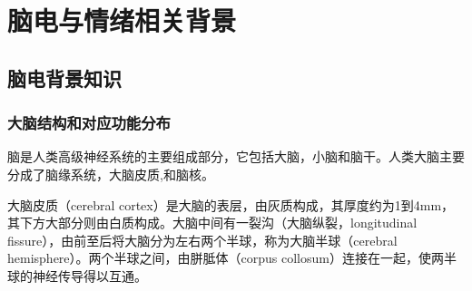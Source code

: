
\chapter{脑电与情绪相关背景}
\label{chap:chap2x}

\section{脑电背景知识}
\subsection{大脑结构和对应功能分布}
	脑是人类高级神经系统的主要组成部分，它包括大脑，小脑和脑干。人类大脑主要分成了脑缘系统，大脑皮质,和脑核。
	
	大脑皮质（cerebral cortex）是大脑的表层，由灰质构成，其厚度约为1到4mm，其下方大部分则由白质构成。大脑中间有一裂沟（大脑纵裂，longitudinal fissure），由前至后将大脑分为左右两个半球，称为大脑半球（cerebral hemisphere）。两个半球之间，由胼胝体（corpus collosum）连接在一起，使两半球的神经传导得以互通。